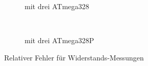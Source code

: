\begin{figure}[H]
  \begin{subfigure}[b]{9cm}
    \centering
    \resizebox{9cm}{!}{}
    \caption{mit drei ATmega328}
    \label{fig:m328res_all}
  \end{subfigure}
  ~
  \begin{subfigure}[b]{9cm}
    \centering
    \resizebox{9cm}{!}{}
    \caption{mit drei ATmega328P}
    \label{fig:m328pres_all}
  \end{subfigure}
\caption{Relativer Fehler für Widerstands-Messungen}
\end{figure}

